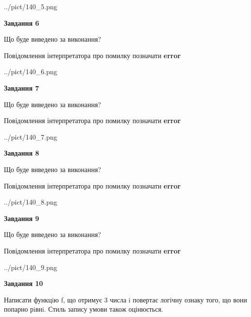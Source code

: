 \documentclass[12pt, ukrainian]{article}
\begin{document}
{\begin {large}
\begin{center}
	{../pict/140_5.png}
\end{center}
\newpage

{\begin {center}\textbf{Завдання 6}\end {center}}\par
Що буде виведено за виконання? \par
Повідомлення інтерпретатора про помилку позначати \textbf{error}

\begin{center}
	{../pict/140_6.png}
\end{center}
\newpage

{\begin {center}\textbf{Завдання 7}\end {center}}\par
Що буде виведено за виконання? \par
Повідомлення інтерпретатора про помилку позначати \textbf{error}

\begin{center}
	{../pict/140_7.png}
\end{center}
\newpage

{\begin {center}\textbf{Завдання 8}\end {center}}\par
Що буде виведено за виконання? \par
Повідомлення інтерпретатора про помилку позначати \textbf{error}

\begin{center}
	{../pict/140_8.png}
\end{center}
\newpage

{\begin {center}\textbf{Завдання 9}\end {center}}\par
Що буде виведено за виконання? \par
Повідомлення інтерпретатора про помилку позначати \textbf{error}

\begin{center}
	{../pict/140_9.png}
\end{center}
\newpage

{\begin {center}\textbf{Завдання 10}\end {center}}\par

Написати функцiю f, що отримує 3 числа i повертає логічну ознаку того, що вони попарно рiвнi. Стиль запису умови також оцінюється.\par
\newpage

\end {large}}
\end{document}
